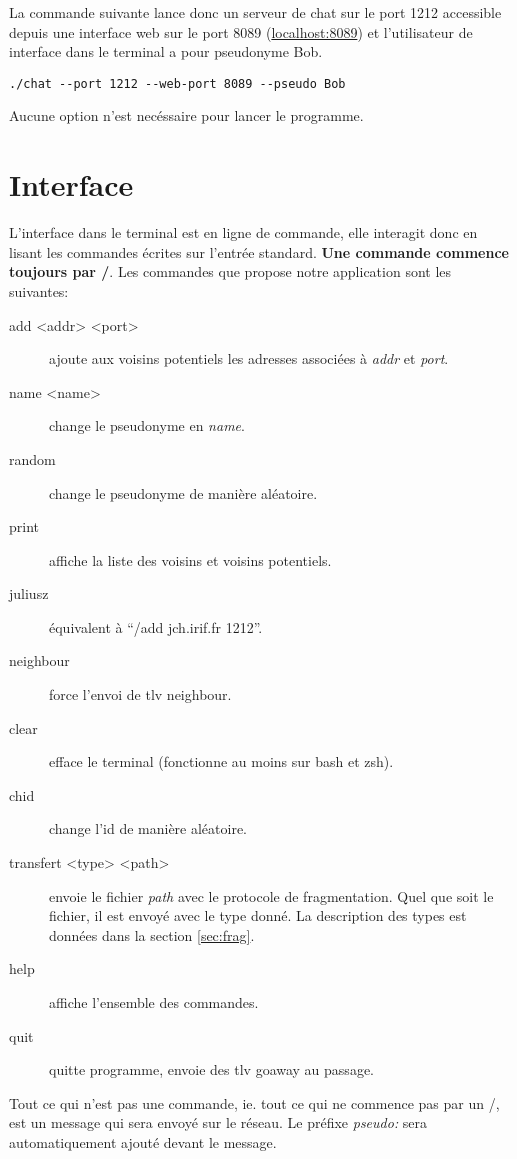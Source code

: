 \documentclass[a4paper,10pt]{article} %
\begin{document}
La commande suivante lance donc un serveur de chat sur le port 1212 accessible depuis une interface web sur le port 8089 (\href{localhost:8089}{localhost:8089}) et l'utilisateur de interface dans le terminal a pour pseudonyme Bob.

\begin{verbatim}
./chat --port 1212 --web-port 8089 --pseudo Bob
\end{verbatim}

Aucune option n'est necéssaire pour lancer le programme.

\section{Interface}

L'interface dans le terminal est en ligne de commande, elle interagit donc en lisant les commandes écrites sur l'entrée standard. \textbf{Une commande commence toujours par /}. Les commandes que propose notre application sont les suivantes:
\begin{description}
\item[add <addr> <port>] ajoute aux voisins potentiels les adresses associées à \textit{addr} et \textit{port}.
\item[name <name>] change le pseudonyme en \textit{name}.
\item[random] change le pseudonyme de manière aléatoire.
\item[print] affiche la liste des voisins et voisins potentiels.
\item[juliusz] équivalent à ``/add jch.irif.fr 1212''.
\item[neighbour] force l'envoi de tlv neighbour.
\item[clear] efface le terminal (fonctionne au moins sur bash et zsh).
\item[chid] change l'id de manière aléatoire.
\item[transfert <type> <path>] envoie le fichier \textit{path} avec le protocole de fragmentation. Quel que soit le fichier, il est envoyé avec le type donné. La description des types est données dans la section \ref{sec:frag}.
\item[help] affiche l'ensemble des commandes.
\item[quit] quitte programme, envoie des tlv goaway au passage.
\end{description}

Tout ce qui n'est pas une commande, ie. tout ce qui ne commence pas par un \textrm{/}, est un message qui sera envoyé sur le réseau. Le préfixe \textit{pseudo: } sera automatiquement ajouté devant le message.\\
\end{document}
